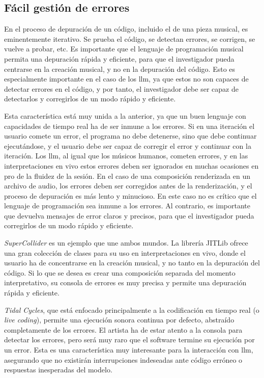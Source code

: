 \subsection{Fácil gestión de errores}
En el proceso de depuración de un código, incluido el de una pieza musical, es eminentemente iterativo. Se prueba el código, se detectan errores, se corrigen, se vuelve a probar, etc. Es importante que el lenguaje de programación musical permita una depuración rápida y eficiente, para que el investigador pueda centrarse en la creación musical, y no en la depuración del código. Esto es especialmente importante en el caso de los \gls{llm}, ya que estos no son capaces de detectar errores en el código, y por tanto, el investigador debe ser capaz de detectarlos y corregirlos de un modo rápido y eficiente.

Esta característica está muy unida a la anterior, ya que un buen lenguaje con capacidades de tiempo real ha de ser inmune a los errores. Si en una iteración el usuario comete un error, el programa no debe detenerse, sino que debe continuar ejecutándose, y el usuario debe ser capaz de corregir el error y continuar con la iteración. Los \gls{llm}, al igual que los músicos humanos, cometen errores, y en las interpretaciones en vivo estos errores deben ser ignorados en muchas ocasiones en pro de la fluidez de la sesión. En el caso de una composición renderizada en un archivo de audio, los errores deben ser corregidos antes de la renderización, y el proceso de depuración es más lento y minucioso. En este caso no es crítico que el lenguaje de programación sea inmune a los errores. Al contrario, es importante que devuelva mensajes de error claros y precisos, para que el investigador pueda corregirlos de un modo rápido y eficiente. 

\emph{SuperCollider} es un ejemplo que une ambos mundos. La librería {JITLib} ofrece una gran colección de clases para su uso en interpretaciones en vivo, donde el usuario ha de concentrarse en la creación musical, y no tanto en la depuración del código. Si lo que se desea es crear una composición separada del momento interpretativo, su consola de errores es muy precisa y permite una depuración rápida y eficiente.

\emph{Tidal Cycles}, que está enfocado principalmente a la codificación en tiempo real (o \emph{live coding}), permite una ejecución sonora continua por defecto, abstraído completamente de los errores. El artista ha de estar atento a la consola para detectar los errores, pero será muy raro que el software termine su ejecución por un error. Esta es una característica muy interesante para la interacción con \gls{llm}, asegurando que no existirán interrupciones indeseadas ante código erróneo o respuestas inesperadas del modelo.

